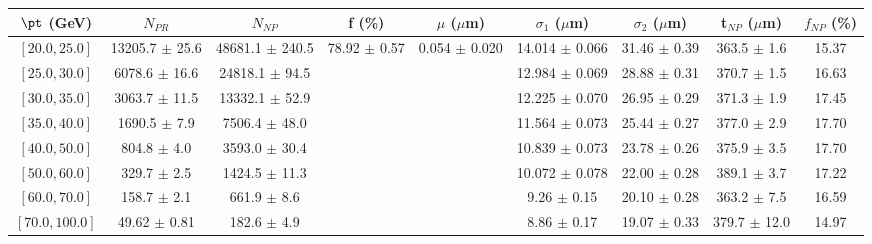 \begin{tabular}{c||c|c|c|c|c|c|c||c}
$\pt$ (GeV) & $N_{PR}$ & $N_{NP}$ & f (\%) & $\mu$ ($\mu$m) & $\sigma_1$ ($\mu$m) & $\sigma_2$ ($\mu$m)  & t$_{NP}$ ($\mu$m) & $f_{NP}$ (\%) \\
\hline
$[20.0, 25.0]$ & 13205.7 $\pm$ 25.6 & 48681.1 $\pm$ 240.5 & \multirow{8}{*}{78.92 $\pm$ 0.57} & \multirow{8}{*}{0.054 $\pm$ 0.020} & 14.014 $\pm$ 0.066 & 31.46 $\pm$ 0.39 & 363.5 $\pm$ 1.6 & 15.37\\
$[25.0, 30.0]$ & 6078.6 $\pm$ 16.6 & 24818.1 $\pm$ 94.5 &  &  & 12.984 $\pm$ 0.069 & 28.88 $\pm$ 0.31 & 370.7 $\pm$ 1.5 & 16.63\\
$[30.0, 35.0]$ & 3063.7 $\pm$ 11.5 & 13332.1 $\pm$ 52.9 &  &  & 12.225 $\pm$ 0.070 & 26.95 $\pm$ 0.29 & 371.3 $\pm$ 1.9 & 17.45\\
$[35.0, 40.0]$ & 1690.5 $\pm$ 7.9 & 7506.4 $\pm$ 48.0 &  &  & 11.564 $\pm$ 0.073 & 25.44 $\pm$ 0.27 & 377.0 $\pm$ 2.9 & 17.70\\
$[40.0, 50.0]$ & 804.8 $\pm$ 4.0 & 3593.0 $\pm$ 30.4 &  &  & 10.839 $\pm$ 0.073 & 23.78 $\pm$ 0.26 & 375.9 $\pm$ 3.5 & 17.70\\
$[50.0, 60.0]$ & 329.7 $\pm$ 2.5 & 1424.5 $\pm$ 11.3 &  &  & 10.072 $\pm$ 0.078 & 22.00 $\pm$ 0.28 & 389.1 $\pm$ 3.7 & 17.22\\
$[60.0, 70.0]$ & 158.7 $\pm$ 2.1 & 661.9 $\pm$ 8.6 &  &  & 9.26 $\pm$ 0.15 & 20.10 $\pm$ 0.28 & 363.2 $\pm$ 7.5 & 16.59\\
$[70.0, 100.0]$ & 49.62 $\pm$ 0.81 & 182.6 $\pm$ 4.9 &  &  & 8.86 $\pm$ 0.17 & 19.07 $\pm$ 0.33 & 379.7 $\pm$ 12.0 & 14.97\\
\end{tabular}
